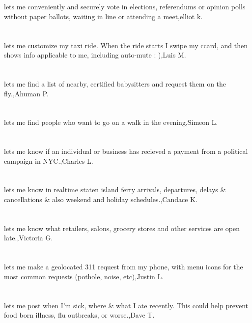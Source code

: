 \section{}lets me conveniently and securely vote in elections, referendums or opinion polls without paper ballots, waiting in line or attending a meet,elliot k.	
\section{}lets me customize my taxi ride. When the ride starts I swipe my ccard, and then shows info applicable to me, including auto-mute : ),Luis M.	
\section{}lets me find a list of nearby, certified babysitters and request them on the fly.,Ahuman P.	
\section{}lets me find people who want to go on a walk in the evening,Simeon L.	
\section{}lets me know if an individual or business has recieved a payment from a political campaign in NYC.,Charles L.	
\section{}lets me know in realtime staten island ferry arrivals, departures, delays \& cancellations \& also weekend and holiday schedules.,Candace K.	
\section{}lets me know what retailers, salons, grocery stores and other services are open late.,Victoria G.	
\section{}lets me make a geolocated 311 request from my phone, with menu icons for the most common requests (pothole, noise, etc),Justin L.	
\section{}lets me post when I'm sick, where \& what I ate recently.  This could help prevent food born illness, flu outbreaks, or worse.,Dave T.	
